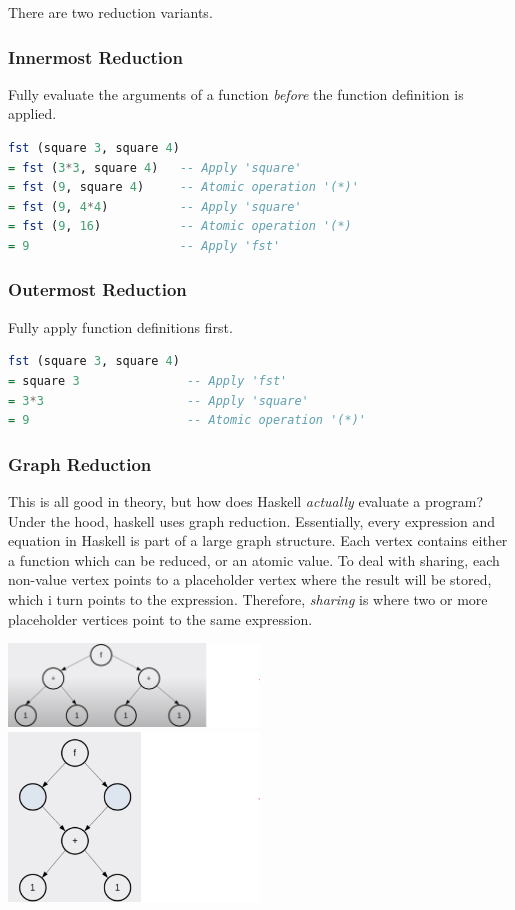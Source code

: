There are two reduction variants.

\subsubsection{Innermost Reduction}
Fully evaluate the arguments of a function \textit{before} the function definition is applied.

\begin{lstlisting}[language=haskell]
fst (square 3, square 4)
= fst (3*3, square 4)   -- Apply 'square'
= fst (9, square 4)     -- Atomic operation '(*)'
= fst (9, 4*4)          -- Apply 'square'
= fst (9, 16)           -- Atomic operation '(*)
= 9                     -- Apply 'fst'
\end{lstlisting}

\subsubsection{Outermost Reduction}
Fully apply function definitions first.

\begin{lstlisting}[language=haskell]
fst (square 3, square 4)
= square 3               -- Apply 'fst'
= 3*3                    -- Apply 'square'
= 9                      -- Atomic operation '(*)'
\end{lstlisting}

\subsubsection{Graph Reduction}
This is all good in theory, but how does Haskell \textit{actually} evaluate a program? Under the hood, haskell uses graph reduction. Essentially, every expression and equation in Haskell is part of a large graph structure. Each vertex contains either a function which can be reduced, or an atomic value. To deal with sharing, each non-value vertex points to a placeholder vertex where the result will be stored, which i turn points to the expression. Therefore, \textit{sharing} is where two or more placeholder vertices point to the same expression.

\medskip
\includegraphics[width=0.5\textwidth]{latex/assets/graph-reduction.png}
\includegraphics[width=0.5\textwidth]{latex/assets/graph-reduction-sharing.png}

